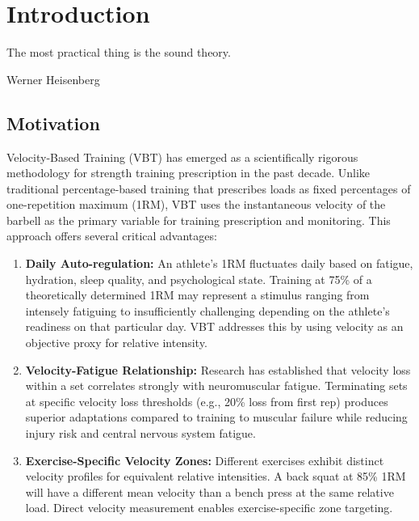 
\chapter{Introduction} \label{chap:introduction}

\epigraph{The most practical thing is the sound theory.}{\textmd{Werner Heisenberg}}

\section{Motivation}

Velocity-Based Training (VBT) has emerged as a scientifically rigorous methodology for strength training prescription in the past decade. Unlike traditional percentage-based training that prescribes loads as fixed percentages of one-repetition maximum (1RM), VBT uses the instantaneous velocity of the barbell as the primary variable for training prescription and monitoring. This approach offers several critical advantages:

\begin{enumerate}
    \item \textbf{Daily Auto-regulation:} An athlete's 1RM fluctuates daily based on fatigue, hydration, sleep quality, and psychological state. Training at 75\% of a theoretically determined 1RM may represent a stimulus ranging from intensely fatiguing to insufficiently challenging depending on the athlete's readiness on that particular day. VBT addresses this by using velocity as an objective proxy for relative intensity.

    \item \textbf{Velocity-Fatigue Relationship:} Research has established that velocity loss within a set correlates strongly with neuromuscular fatigue. Terminating sets at specific velocity loss thresholds (e.g., 20\% loss from first rep) produces superior adaptations compared to training to muscular failure while reducing injury risk and central nervous system fatigue.

    \item \textbf{Exercise-Specific Velocity Zones:} Different exercises exhibit distinct velocity profiles for equivalent relative intensities. A back squat at 85\% 1RM will have a different mean velocity than a bench press at the same relative load. Direct velocity measurement enables exercise-specific zone targeting.
\end{enumerate}

